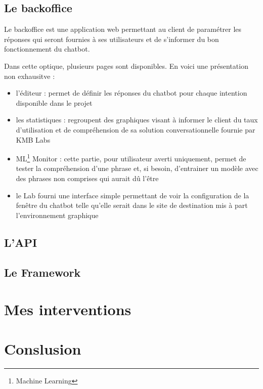 \documentclass[12pt,a4paper,twoside]{scrreprt}
\begin{document}
\section{Le backoffice}

Le backoffice est une application web permettant au client de paramétrer les réponses qui seront fournies à ses utilisateurs et de s'informer du bon fonctionnement du chatbot.

Dans cette optique, plusieurs pages sont disponibles. En voici une présentation non exhausitve :
\begin{itemize}
\item l'éditeur : permet de définir les réponses du chatbot pour chaque intention disponible dans le projet
\item les statistiques : regroupent des graphiques visant à informer le client du taux d'utilisation et de compréhension de sa solution conversationnelle fournie par KMB Labs
\item ML\footnote{Machine Learning} Monitor : cette partie, pour utilisateur averti uniquement, permet de tester la compréhension d'une phrase et, si besoin, d'entrainer un modèle avec des phrases non comprises qui aurait dû l'être
\item le Lab fourni une interface simple permettant de voir la configuration de la fenêtre du chatbot telle qu'elle serait dans le site de destination mis à part l'environnement graphique
\end{itemize}

\section{L'API}

\section{Le Framework}

\chapter{Mes interventions}

\chapter{Conslusion}
\end{document}
